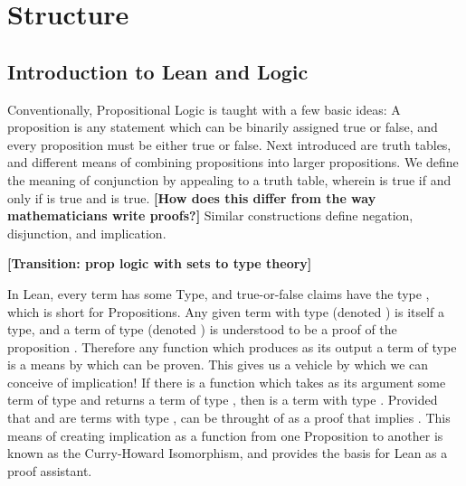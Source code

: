 

\chapter{Structure}

\section{Introduction to Lean and Logic}

Conventionally, Propositional Logic is taught with a few basic ideas:
A proposition is any statement which can be binarily assigned true or 
false, and every proposition must be either true or false. Next introduced 
are truth tables, and different means of combining propositions into 
larger propositions. We define the meaning of conjunction by appealing to 
a truth table, wherein  is true if and only if  is true 
and  is true. \textbf{[How does this differ from the way mathematicians write proofs?]}
Similar constructions define negation, disjunction, and implication. 

\textbf{[Transition: prop logic with sets to type theory]}

In Lean, every term has some Type, and true-or-false claims have the type 
, which is short for Propositions. Any given term  with
type  (denoted ) is itself a type, and a term 
 of type  (denoted ) is understood to be a 
proof of the proposition . Therefore any function which produces as its
output a term of type  is a means by which  can be proven. This gives 
us a vehicle by which we can conceive of implication! If there is a function
 which takes as its argument some term  of type  and returns
a term of type , then  is a term with type . Provided that 
 and  are terms with type ,  can be throught of as a proof
that  implies . This means of creating implication as a function from
one Proposition to another is known as the Curry-Howard Isomorphism, and
provides the basis for Lean as a proof assistant. 

